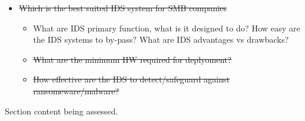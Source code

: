\begin{notes}


    \begin{itemize}
        \item \sout{Which is the best suited IDS system for SMB companies}
        \begin{itemize}
            \item What are IDS primary function, what is it designed to do? How easy are the IDS systems to by-pass? What are IDS advantages vs drawbacks?
            \item \sout{What are the minimum HW required for deplyoment?}
            \item \sout{How effective are the IDS to detect/safeguard against ransomeware/malware?}
        \end{itemize}

    \end{itemize}
    
    Section content being assessed.

\end{notes}